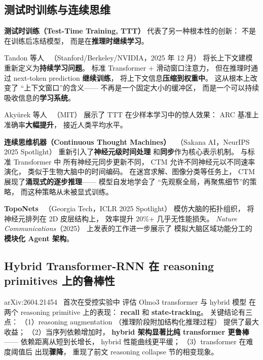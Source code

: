 \subsection{测试时训练与连续思维}

\textbf{测试时训练（Test-Time Training, TTT）}
代表了另一种根本性的创新：
不是在训练后冻结模型，
而是在\textbf{推理时继续学习}。

Tandon 等人~\cite{tandon2025ttt}
（Stanford/Berkeley/NVIDIA，2025 年 12 月）
将长上下文建模重新定义为\textbf{持续学习问题}。
标准 Transformer + 滑动窗口注意力，
但在推理时通过 next-token prediction \textbf{继续训练}，
将上下文信息\textbf{压缩到权重中}。
这从根本上改变了
``上下文窗口''的含义——
不再是一个固定大小的缓冲区，
而是一个可以持续吸收信息的\textbf{学习系统}。

Aky\"{u}rek 等人~\cite{akyurek2025ttt}
（MIT）
展示了 TTT 在少样本学习中的惊人效果：
ARC 基准上准确率\textbf{大幅提升}，
接近人类平均水平。

\textbf{连续思维机器（Continuous Thought Machines）}~\cite{sakana2025ctm}
（Sakana AI，NeurIPS 2025 Spotlight）
重新引入了\textbf{神经元级时间处理}
和\textbf{同步}作为核心表示机制。
与标准 Transformer 中
所有神经元同步更新不同，
CTM 允许不同神经元以不同速率演化，
类似于生物大脑中的时间编码。
在迷宫求解、图像分类等任务上，
CTM 展现了\textbf{涌现式的逐步推理}——
模型自发地学会了
``先观察全局，再聚焦细节''的策略，
而这种策略从未被显式训练。

\textbf{TopoNets}~\cite{rajkumar2025toponets}
（Georgia Tech，ICLR 2025 Spotlight）
模仿大脑的拓扑组织，
将神经元排列在 2D 皮层结构上，
效率提升 20\%+ 几乎无性能损失。
\textit{Nature Communications}（2025）
上发表的工作进一步展示了
模拟大脑区域功能分工的
\textbf{模块化 Agent 架构}。


\subsection{Hybrid Transformer-RNN 在 reasoning primitives 上的鲁棒性}

arXiv:2604.21454~\cite{reasoningprimitives2026}
首次在受控实验中
评估 Olmo3 transformer 与 hybrid 模型
在两个 reasoning primitive 上的表现：
\textbf{recall} 和 \textbf{state-tracking}。
关键结论有三点：
（1）reasoning augmentation
（推理阶段附加结构化推理过程）
提供了最大收益；
（2）当序列依赖增加时，
\textbf{hybrid 架构显著比纯 transformer 更鲁棒}——
依赖距离从短到长增长，
hybrid 性能曲线更平缓；
（3）transformer 在难度阈值后
出现\textbf{骤降}，
重现了前文 reasoning collapse 节的相变现象。

